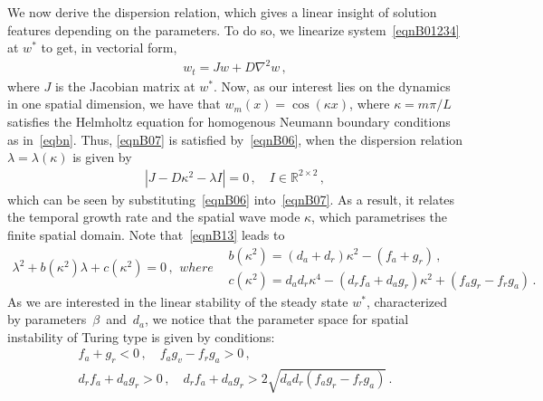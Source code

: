 \documentclass[%
 preprint,
 amsmath,amssymb,
 aps,
]{revtex4-2}
\begin{document}
We now derive the dispersion relation, which gives a linear insight of solution features depending on the parameters. To do so, we linearize system~\eqref{eqnB01234} at $w^*$ to get, in vectorial form,
	\begin{gather}\label{eqnB07}
	w_t = Jw + D \nabla^2 w	\,,
	\end{gather}
	where $J$ is the Jacobian matrix at $w^*$. Now, as our interest lies on the dynamics in one spatial dimension, we have that $w_m(x)=\cos(\kappa x)$, where $\kappa=m\pi/L$ satisfies the Helmholtz equation for homogenous Neumann boundary conditions as in~\eqref{eqbn}. Thus, \eqref{eqnB07} is satisfied by~\eqref{eqnB06}, when the dispersion relation $\lambda=\lambda(\kappa)$ is given by
	\begin{gather}\label{eqnB13}
	|J-D\kappa^2-\lambda I|=0\,, \quad I\in\mathbb{R}^{2\times2}\,,
	\end{gather}
	which can be seen by substituting~\eqref{eqnB06} into~\eqref{eqnB07}. As a result, it relates the temporal growth rate and the spatial wave mode $\kappa$, which parametrises the finite spatial domain. Note that~\eqref{eqnB13} leads to 
	\begin{subequations}\label{eq:lambda}
		\begin{gather}\label{eqnB14}
		\lambda^2 + b(\kappa^2)\lambda + c(\kappa^2) =0\,,
		\end{gather}
		where
		\begin{flalign}
		& b(\kappa^2)=(d_a+d_r)\kappa^2 -(f_a+g_r)\,, \label{eqnB15} \\
		& c(\kappa^2)=d_ad_r\kappa^4-(d_rf_a+d_ag_r)\kappa^2+ (f_ag_r-f_rg_a) \,.\label{eqnB16}
		\end{flalign}
	\end{subequations}
As we are interested in the linear stability of the steady state $w^*$, characterized by parameters~$\beta$~and~$d_a$, we notice that the parameter space for spatial instability of Turing type is given by conditions: 
\begin{subequations} \label{eqnB17}
	\begin{gather}
	f_a+g_r<0\,, \quad f_ag_v-f_rg_a>0 \,, \label{eqnB18} \\
	d_rf_a + d_ag_r > 0 \,, \quad d_rf_a + d_ag_r > 2\sqrt{d_ad_r(f_ag_r-f_rg_a)} \,. \label{eqnB20}%
	\end{gather}
\end{subequations} 
\end{document}
